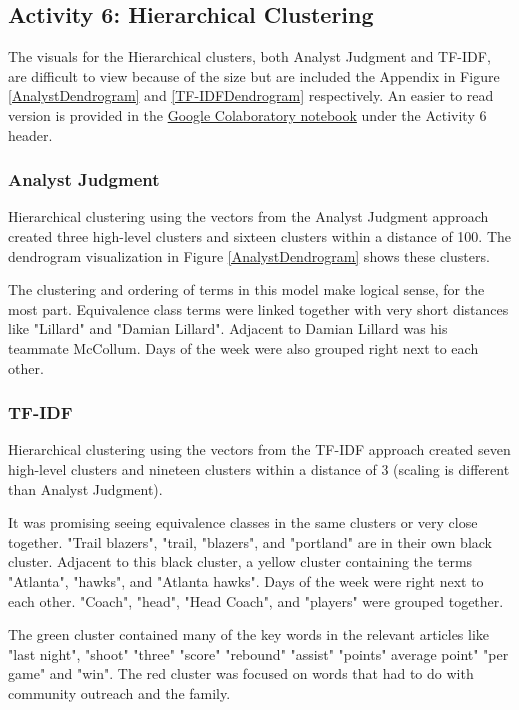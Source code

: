 \documentclass[5p,authoryear]{elsarticle}
\begin{document}
\subsection{Activity 6: Hierarchical Clustering}\label{one}

The visuals for the Hierarchical clusters, both Analyst Judgment and TF-IDF, are difficult to view because of the size but are included the Appendix in Figure \ref{AnalystDendrogram} and \ref{TF-IDFDendrogram} respectively. 
An easier to read version is provided in the \href{https://colab.research.google.com/drive/13FXvFBOhEdyr4pE_DFnIXSTYEzwBTkV_?usp=sharing}{Google Colaboratory notebook} under the Activity 6 header. 

\subsubsection{Analyst Judgment}\label{judge3}

Hierarchical clustering using the vectors from the Analyst Judgment approach created three high-level clusters and sixteen clusters within a distance of 100. 
The dendrogram visualization in Figure \ref{AnalystDendrogram} shows these clusters.

The clustering and ordering of terms in this model make logical sense, for the most part.
Equivalence class terms were linked together with very short distances like "Lillard" and "Damian Lillard". 
Adjacent to Damian Lillard was his teammate McCollum.
Days of the week were also grouped right next to each other.

\subsubsection{TF-IDF}\label{tfidf3}

Hierarchical clustering using the vectors from the TF-IDF approach created seven high-level clusters and nineteen clusters within a distance of 3 (scaling is different than Analyst Judgment). 

It was promising seeing equivalence classes in the same clusters or very close together. 
"Trail blazers", "trail, "blazers", and "portland" are in their own black cluster.
Adjacent to this black cluster, a yellow cluster containing the terms "Atlanta", "hawks", and "Atlanta hawks".
Days of the week were right next to each other.
"Coach", "head", "Head Coach", and "players" were grouped together. 

The green cluster contained many of the key words in the relevant articles like "last night", "shoot" "three" "score" "rebound" "assist" "points" average point" "per game" and "win".
The red cluster was focused on words that had to do with community outreach and the family. 
\end{document}
